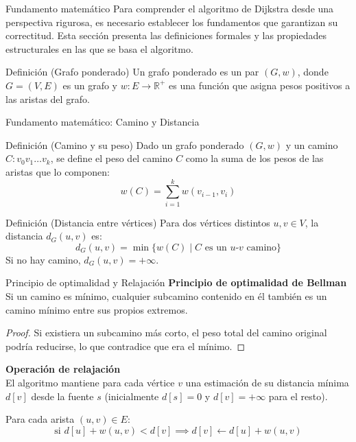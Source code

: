 \documentclass{beamer}
\begin{document}
    \begin{frame}{Fundamento matemático}
        Para comprender el algoritmo de Dijkstra desde una perspectiva rigurosa, es necesario establecer los fundamentos que garantizan su correctitud. Esta sección presenta las definiciones formales y las propiedades estructurales en las que se basa el algoritmo.
        
        \begin{block}{Definición (Grafo ponderado)}
        Un grafo ponderado es un par $(G, w)$, donde $G=(V,E)$ es un grafo y $w:E\rightarrow\mathbb{R}^{+}$ es una función que asigna pesos positivos a las aristas del grafo.
        \end{block}
    \end{frame}

    \begin{frame}{Fundamento matemático: Camino y Distancia}
        \begin{block}{Definición (Camino y su peso)}
        Dado un grafo ponderado $(G, w)$ y un camino $C:v_{0}v_{1}\dots v_{k}$, se define el peso del camino $C$ como la suma de los pesos de las aristas que lo componen:
        \[
        w(C)=\sum_{i=1}^{k}w(v_{i-1},v_{i})
        \]
        \end{block}
        
        \begin{block}{Definición (Distancia entre vértices)}
        Para dos vértices distintos $u, v \in V$, la distancia $d_{G}(u,v)$ es:
        \[
        d_{G}(u,v)=\min\{w(C) \mid C \text{ es un } u\text{-}v \text{ camino}\}
        \]
        Si no hay camino, $d_{G}(u,v)=+\infty$.
        \end{block}
    \end{frame}

    \begin{frame}{Principio de optimalidad y Relajación}
        \textbf{Principio de optimalidad de Bellman}\\
        Si un camino es mínimo, cualquier subcamino contenido en él también es un camino mínimo entre sus propios extremos.

        \begin{proof}
        Si existiera un subcamino más corto, el peso total del camino original podría reducirse, lo que contradice que era el mínimo.
        \end{proof}
        
        \vspace{0.3cm}
        \textbf{Operación de relajación}\\
        El algoritmo mantiene para cada vértice $v$ una estimación de su distancia mínima $d[v]$ desde la fuente $s$ (inicialmente $d[s] = 0$ y $d[v] = +\infty$ para el resto).
        
        Para cada arista $(u, v) \in E$:
        \[
        \text{si } d[u] + w(u,v) < d[v] \implies d[v] \gets d[u] + w(u,v)
        \]
    \end{frame}
\end{document}
